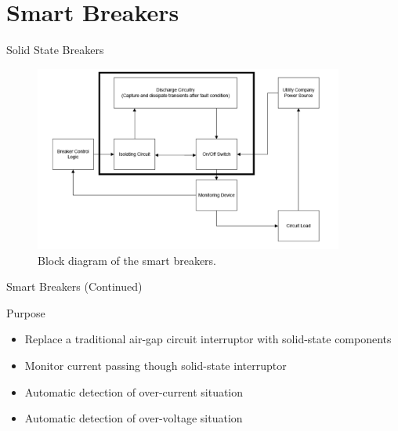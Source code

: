 \documentclass{beamer}
\begin{document}
\section{Smart Breakers}
\begin{frame}{Solid State Breakers}
	\begin{figure}[htbp]
	\begin{center}
	\includegraphics[width=4in]{includes/SSB_Functional_Diagram}
	\caption{Block diagram of the smart breakers.}
	\label{fig:ssb_block_diagram}
	\end{center}
	\end{figure}
\end{frame}

\begin{frame}{Smart Breakers (Continued)}
	\begin{block}{Purpose}
		\begin{itemize}
		\item <1-> Replace a traditional air-gap circuit interruptor with solid-state components
		\item <2 -> Monitor current passing though solid-state interruptor
		\item <3 -> Automatic detection of over-current situation
		\item <4 -> Automatic detection of over-voltage situation
		\end{itemize}
	\end{block}
\end{frame}
\end{document}
